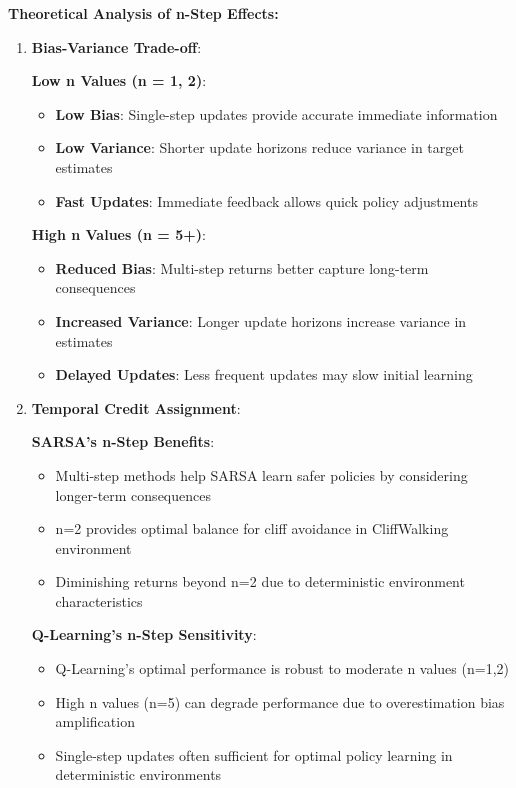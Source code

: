 \documentclass[12pt]{article}
\begin{document}
{{{\textbf{Theoretical Analysis of n-Step Effects:}

\begin{enumerate}
    \item \textbf{Bias-Variance Trade-off}:
    
    \textbf{Low n Values (n = 1, 2)}:
    \begin{itemize}
        \item \textbf{Low Bias}: Single-step updates provide accurate immediate information
        \item \textbf{Low Variance}: Shorter update horizons reduce variance in target estimates
        \item \textbf{Fast Updates}: Immediate feedback allows quick policy adjustments
    \end{itemize}
    
    \textbf{High n Values (n = 5+)}:
    \begin{itemize}
        \item \textbf{Reduced Bias}: Multi-step returns better capture long-term consequences
        \item \textbf{Increased Variance}: Longer update horizons increase variance in estimates
        \item \textbf{Delayed Updates}: Less frequent updates may slow initial learning
    \end{itemize}
    
    \item \textbf{Temporal Credit Assignment}:
    
    \textbf{SARSA's n-Step Benefits}:
    \begin{itemize}
        \item Multi-step methods help SARSA learn safer policies by considering longer-term consequences
        \item n=2 provides optimal balance for cliff avoidance in CliffWalking environment
        \item Diminishing returns beyond n=2 due to deterministic environment characteristics
    \end{itemize}
    
    \textbf{Q-Learning's n-Step Sensitivity}:
    \begin{itemize}
        \item Q-Learning's optimal performance is robust to moderate n values (n=1,2)
        \item High n values (n=5) can degrade performance due to overestimation bias amplification
        \item Single-step updates often sufficient for optimal policy learning in deterministic environments
    \end{itemize}
\end{enumerate}

}}}
\end{document}
